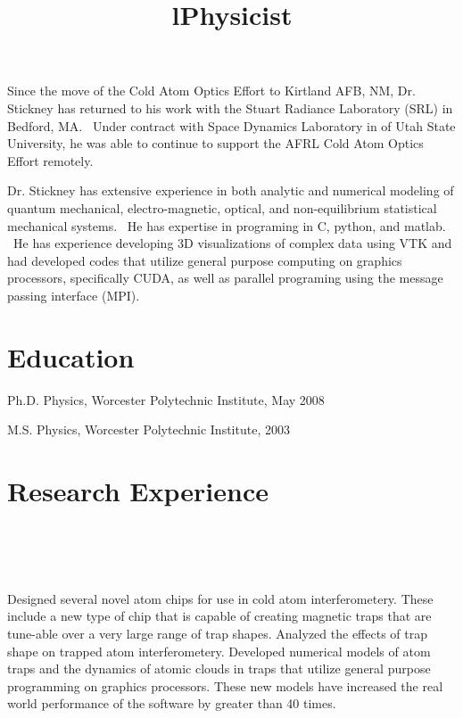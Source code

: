 \documentclass[overlapped,line,letterpaper]{res}
\begin{document}
\begin{resume}
Since the move of the Cold Atom Optics Effort to Kirtland AFB, NM, Dr. Stickney has returned to his work with the Stuart Radiance Laboratory (SRL) in Bedford, MA.  Under contract with Space Dynamics Laboratory in of Utah State University, he was able to continue to support the AFRL Cold Atom Optics Effort remotely.

Dr. Stickney has extensive experience in both analytic and numerical modeling of quantum mechanical, electro-magnetic, optical, and non-equilibrium statistical mechanical systems.  He has expertise in programing in C, python, and matlab.  He has experience developing 3D visualizations of complex data using VTK and had developed codes that utilize general purpose computing on graphics processors, specifically CUDA, as well as parallel programing using the message passing interface (MPI). 



\section{\bf Education}
Ph.D. Physics, Worcester Polytechnic Institute, May 2008 

M.S. Physics, Worcester Polytechnic Institute, 2003


\section{\bf Research Experience}

\begin{format}
\title{l}\\
\\
\body\\
\end{format}

\title{Physicist}
\begin{position}
Designed several novel atom chips for use in cold atom interferometery.  These include a new type  of chip that is capable of creating magnetic traps that are tune-able over a very large range of trap shapes.  Analyzed the effects of trap shape on trapped atom interferometery.  Developed numerical models of atom traps and the dynamics of atomic clouds in traps that utilize general purpose programming on graphics processors.  These new models have increased the real world performance of the software by greater than 40 times.  
\end{position}


\end{resume}
\end{document}
